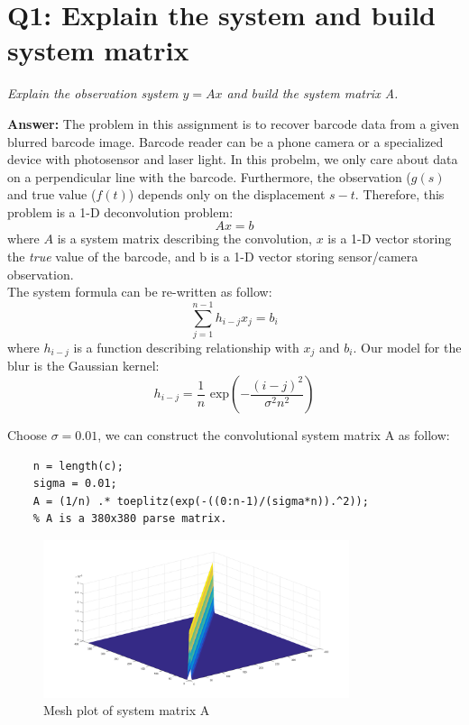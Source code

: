 \documentclass[a4paper,12pt]{article}
\begin{document}
\section*{Q1: Explain the system and build system matrix}
\setcounter{section}{1}

\textit{Explain the observation system $y = Ax$ and build the system matrix A.} 

\vspace{1.5em}
\noindent
\textbf{Answer:} 
\noindent
The problem in this assignment is to recover barcode data from a given blurred barcode image. Barcode reader can be a phone camera or a specialized device with photosensor and laser light. In this probelm, we only care about data on a perpendicular line with the barcode. Furthermore, the observation ($g(s)$ and true value ($f(t)$) depends only on the displacement $s-t$. Therefore, this problem is a 1-D deconvolution problem:
$$ Ax = b $$
where $A$ is a system matrix describing the convolution, $x$ is a 1-D vector storing the \emph{true} value of the barcode, and b is a 1-D vector storing sensor/camera observation. \\ 

The system formula can be re-written as follow: 
$$ \sum_{j=1}^{n-1} h_{i-j}x_j = b_i $$
where $h_{i-j}$ is a function describing relationship with $x_j$ and $b_i$. Our model for the blur is the Gaussian kernel:
$$ h_{i-j} = \frac{1}{n} \mbox{ exp}\left(-\frac{(i-j)^2}{\sigma^2 n^2} \right) $$

Choose $\sigma = 0.01$, we can construct the convolutional system matrix A as follow:

\begin{lstlisting}[caption={MATLAB code for system matrix A. }]
	% Get length of the observation vector from given c in decom.m
	n = length(c);
	sigma = 0.01;
	A = (1/n) .* toeplitz(exp(-((0:n-1)/(sigma*n)).^2));
	% A is a 380x380 parse matrix.
\end{lstlisting}

\begin{figure}[h]
	\centering
	\includegraphics[width=0.8\textwidth]{matA.png}
	\caption{Mesh plot of system matrix A}
	\label{fig:matA}
\end{figure}
 
\end{document}
